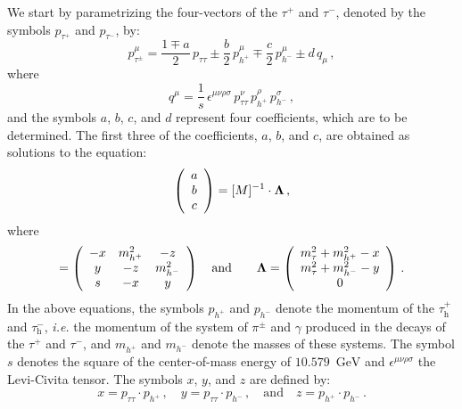 \documentclass[a4paper,12pt,twocolumn]{article}
\numberwithin{equation}{section} %
\def\ie{{\it i.e.}\xspace}
\newcommand{\Pgg}{\ensuremath{\gamma}\xspace}
\newcommand{\Pgppm}{\ensuremath{\pi^{\pm}}\xspace}
\newcommand{\Pgt}{\ensuremath{\tau}\xspace}
\newcommand{\Pgtm}{\ensuremath{\tau^{-}}\xspace}
\newcommand{\Pgtp}{\ensuremath{\tau^{+}}\xspace}
\newcommand{\tauhp}{\ensuremath{\Pgt_{\textrm{h}}^{+}}\xspace}
\newcommand{\tauhm}{\ensuremath{\Pgt_{\textrm{h}}^{-}}\xspace}
\newcommand{\GeV}{\ensuremath{\textrm{GeV}}\xspace}
\newcommand{\h}{\ensuremath{h}\xspace}
\begin{document}
We start by parametrizing the four-vectors of the $\Pgtp$ and $\Pgtm$, denoted by the symbols $p_{\Pgtp}$ and $p_{\Pgtm}$, by:
\begin{equation}
p_{\Pgt^{\pm}}^{\mu} = \frac{1 \mp a}{2} \, p_{\Pgt\Pgt} \pm \frac{b}{2} \, p_{\h^{+}}^{\mu} \mp \frac{c}{2} \, p_{\h^{-}}^{\mu} \pm d \, q_{\mu} \, ,
\end{equation}
where
\begin{equation}
q^{\mu} = \frac{1}{s} \, \epsilon^{\mu\nu\rho\sigma} \, p_{\Pgt\Pgt}^{\nu} \, p_{\h^{+}}^{\rho} \, p_{\h^{-}}^{\sigma} \, ,
\end{equation}
and the symbols $a$, $b$, $c$, and $d$ represent four coefficients, which are to be determined.
The first three of the coefficients, $a$, $b$, and $c$, are obtained as solutions to the equation:
\begin{equation}
\left(
\begin{array}{c}
 a \\
 b \\
 c \\ 
\end{array}
\right) = [M]^{-1} \cdot {\bf \Lambda} \, ,
\end{equation}
where
\begin{equation}
[M] = \left(
\begin{array}{ccc}
-x & m_{\h^{+}}^{2} & -z \\
 y & -z & m_{\h^{-}}^{2} \\
 s & -x & y \\ 
\end{array}
\right) \quad \textrm{and} \quad 
\quad {\bf \Lambda} = \left(
\begin{array}{c}
 m_{\Pgt}^{2} + m_{\h^{+}}^{2} - x \\
 m_{\Pgt}^{2} + m_{\h^{-}}^{2} - y \\
 0 \\ 
\end{array}
\right) \, .
\label{eq:step1_M}
\end{equation}
In the above equations, the symbols $p_{\h^{+}}$ and $p_{\h^{-}}$ denote the momentum of the $\tauhp$ and $\tauhm$, \ie the momentum of the system of $\Pgppm$ and $\Pgg$ produced in the decays of the $\Pgtp$ and $\Pgtm$, and $m_{\h^{+}}$ and $m_{\h^{-}}$ denote the masses of these systems.
The symbol $s$ denotes the square of the center-of-mass energy of $10.579$~\GeV and $\epsilon^{\mu\nu\rho\sigma}$ the Levi-Civita tensor.
The symbols $x$, $y$, and $z$ are defined by:
\begin{equation}
x = p_{\Pgt\Pgt} \cdot p_{\h^{+}} \, , 
\quad y = p_{\Pgt\Pgt} \cdot p_{\h^{-}} \, , \quad \textrm{and}
\quad z = p_{\h^{+}} \cdot p_{\h^{-}} \, .
\end{equation}
\end{document}
